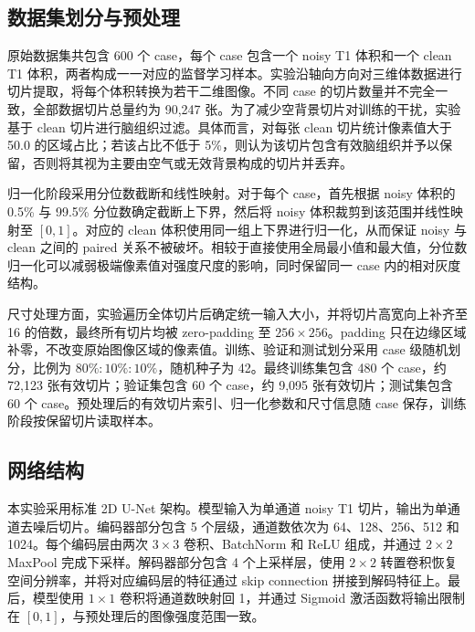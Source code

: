 \documentclass[UTF8,a4paper,12pt]{ctexart}
\begin{document}
\subsection{数据集划分与预处理}

原始数据集共包含 600 个 case，每个 case 包含一个 noisy T1 体积和一个 clean T1 体积，两者构成一一对应的监督学习样本。实验沿轴向方向对三维体数据进行切片提取，将每个体积转换为若干二维图像。不同 case 的切片数量并不完全一致，全部数据切片总量约为 90,247 张。为了减少空背景切片对训练的干扰，实验基于 clean 切片进行脑组织过滤。具体而言，对每张 clean 切片统计像素值大于 50.0 的区域占比；若该占比不低于 5\%，则认为该切片包含有效脑组织并予以保留，否则将其视为主要由空气或无效背景构成的切片并丢弃。

归一化阶段采用分位数截断和线性映射。对于每个 case，首先根据 noisy 体积的 0.5\% 与 99.5\% 分位数确定截断上下界，然后将 noisy 体积裁剪到该范围并线性映射至 $[0,1]$。对应的 clean 体积使用同一组上下界进行归一化，从而保证 noisy 与 clean 之间的 paired 关系不被破坏。相较于直接使用全局最小值和最大值，分位数归一化可以减弱极端像素值对强度尺度的影响，同时保留同一 case 内的相对灰度结构。

尺寸处理方面，实验遍历全体切片后确定统一输入大小，并将切片高宽向上补齐至 16 的倍数，最终所有切片均被 zero-padding 至 $256\times256$。padding 只在边缘区域补零，不改变原始图像区域的像素值。训练、验证和测试划分采用 case 级随机划分，比例为 $80\%:10\%:10\%$，随机种子为 42。最终训练集包含 480 个 case，约 72,123 张有效切片；验证集包含 60 个 case，约 9,095 张有效切片；测试集包含 60 个 case。预处理后的有效切片索引、归一化参数和尺寸信息随 case 保存，训练阶段按保留切片读取样本。

\subsection{网络结构}

本实验采用标准 2D U-Net 架构。模型输入为单通道 noisy T1 切片，输出为单通道去噪后切片。编码器部分包含 5 个层级，通道数依次为 64、128、256、512 和 1024。每个编码层由两次 $3\times3$ 卷积、BatchNorm 和 ReLU 组成，并通过 $2\times2$ MaxPool 完成下采样。解码器部分包含 4 个上采样层，使用 $2\times2$ 转置卷积恢复空间分辨率，并将对应编码层的特征通过 skip connection 拼接到解码特征上。最后，模型使用 $1\times1$ 卷积将通道数映射回 1，并通过 Sigmoid 激活函数将输出限制在 $[0,1]$，与预处理后的图像强度范围一致。
\end{document}
